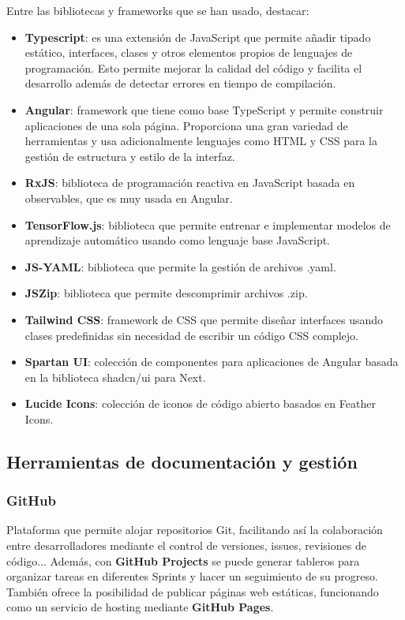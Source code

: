 Entre las bibliotecas y frameworks que se han usado, destacar:
\begin{itemize}
    \item \textbf{Typescript}: es una extensión de JavaScript que permite añadir tipado estático, interfaces, clases y otros elementos propios de lenguajes de programación. Esto permite mejorar la calidad del código y facilita el desarrollo además de detectar errores en tiempo de compilación.
    \item \textbf{Angular}: framework que tiene como base TypeScript y permite construir aplicaciones de una sola página. Proporciona una gran variedad de herramientas y usa adicionalmente lenguajes como HTML y CSS para la gestión de estructura y estilo de la interfaz.
    \item \textbf{RxJS}: biblioteca de programación reactiva en JavaScript basada en observables, que es muy usada en Angular. 
    \item \textbf{TensorFlow.js}: biblioteca que permite entrenar e implementar modelos de aprendizaje automático usando como lenguaje base JavaScript.
    \item \textbf{JS-YAML}: biblioteca que permite la gestión de archivos .yaml.
    \item \textbf{JSZip}: biblioteca que permite descomprimir archivos .zip.
    \item \textbf{Tailwind CSS}: framework de CSS que permite diseñar interfaces usando clases predefinidas sin necesidad de escribir un código CSS complejo.
    \item \textbf{Spartan UI}: colección de componentes para aplicaciones de Angular basada en la biblioteca shadcn/ui para Next.
    \item \textbf{Lucide Icons}: colección de iconos de código abierto basados en Feather Icons.
\end{itemize}

\pagebreak
\subsection{Herramientas de documentación y gestión}
\label{subsec:Gestion}
\subsubsection{GitHub}
\label{subsubsec:GitHub}
Plataforma que permite alojar repositorios Git, facilitando así la colaboración entre desarrolladores mediante el control de versiones, issues, revisiones de código... Además, con \textbf{GitHub Projects} se puede generar tableros para organizar tareas en diferentes Sprints y hacer un seguimiento de su progreso. También ofrece la posibilidad de publicar páginas web estáticas, funcionando como un servicio de hosting mediante \textbf{GitHub Pages}.

